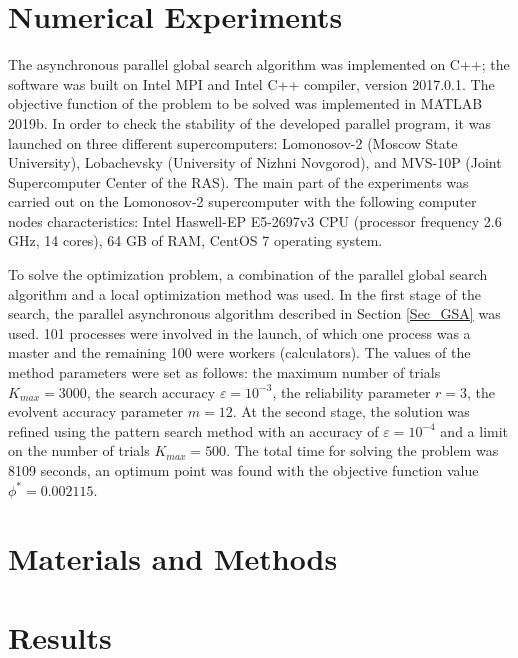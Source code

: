 \documentclass[mathematics,article,submit,pdftex,moreauthors]{Definitions/mdpi}
\begin{document}
\section{Numerical Experiments}

The asynchronous parallel global search algorithm was implemented on C++; the software was built on Intel MPI and Intel C++ compiler, version 2017.0.1. The objective function of the problem to be solved was implemented in MATLAB 2019b.
In order to check the stability of the developed parallel program, it was launched on three different supercomputers: Lomonosov-2 (Moscow State University), Lobachevsky (University of Nizhni Novgorod), and MVS-10P (Joint Supercomputer Center of the RAS). The main part of the experiments was carried out on the Lomonosov-2 supercomputer with the following computer nodes characteristics: Intel Haswell-EP E5-2697v3 CPU (processor frequency 2.6 GHz, 14 cores), 64 GB of RAM, CentOS 7 operating system.

To solve the optimization problem, a combination of the parallel global search algorithm and a local optimization method was used. In the first stage of the search, the parallel asynchronous algorithm described in Section \ref{Sec_GSA} was used. 101 processes were involved in the launch, of which one process was a master and the remaining 100 were workers (calculators). The values of the method parameters were set as follows: the maximum number of trials $K_{max}=3000$, the search accuracy $\varepsilon=10^{-3}$, the reliability parameter $r=3$, the evolvent accuracy parameter $m=12$. At the second stage, the solution was refined using the pattern search method with an accuracy of $\varepsilon=10^{-4}$ and a limit on the number of trials $K_{max}=500$.
The total time for solving the problem was 8109 seconds, an optimum point was found with the objective function value $\phi^* = 0.002115$.






\section{Materials and Methods}


\section{Results}
\end{document}
